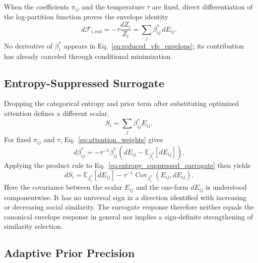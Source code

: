 \documentclass[12pt]{article}
\begin{document}
When the coefficients $\pi_{ij}$ and the temperature $\tau$ are fixed, direct differentiation of the log-partition function proves the envelope identity
\begin{equation}
\boxed{
d\mathcal F_{i,\mathrm{red}}
=-\tau\frac{dZ_i}{Z_i}
=\sum_j\beta_{ij}^*\,dE_{ij}.}
\label{eq:reduced_vfe_envelope}
\end{equation}
No derivative of $\beta_i^*$ appears in Eq.~\eqref{eq:reduced_vfe_envelope}; its contribution has already canceled through conditional minimization.

\subsection{Entropy-Suppressed Surrogate}

Dropping the categorical entropy and prior term after substituting optimized attention defines a different scalar,
\begin{equation}
S_i=\sum_j\beta_{ij}^*E_{ij}.
\label{eq:entropy_suppressed_surrogate}
\end{equation}
For fixed $\pi_{ij}$ and $\tau$, Eq.~\eqref{eq:attention_weights} gives
\begin{equation}
d\beta_{ij}^*
=-\tau^{-1}\beta_{ij}^*
\left(dE_{ij}-\mathbb E_{\beta_i^*}[dE_{ij}]\right).
\label{eq:attention_weight_differential}
\end{equation}
Applying the product rule to Eq.~\eqref{eq:entropy_suppressed_surrogate} then yields
\begin{equation}
\boxed{
dS_i
=\mathbb E_{\beta_i^*}[dE_{ij}]
-\tau^{-1}\operatorname{Cov}_{\beta_i^*}(E_{ij},dE_{ij}).}
\label{eq:entropy_suppressed_differential}
\end{equation}
Here the covariance between the scalar $E_{ij}$ and the one-form $dE_{ij}$ is understood componentwise. It has no universal sign in a direction identified with increasing or decreasing social similarity. The surrogate response therefore neither equals the canonical envelope response in general nor implies a sign-definite strengthening of similarity selection.

\subsection{Adaptive Prior Precision}
\label{sec:state_dependent_precision}
\end{document}
